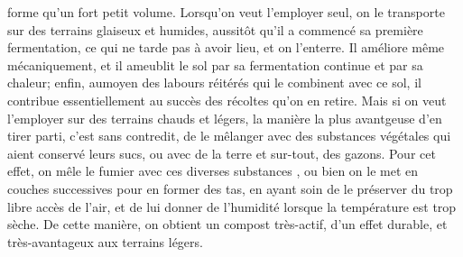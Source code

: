 forme qu'un fort petit volume.
Lorsqu'on veut l'employer seul, on le transporte sur des terrains glaiseux et humides,
aussitôt qu'il a commencé sa première fermentation, ce qui ne tarde pas à avoir lieu,
et on l'enterre. Il améliore même mécaniquement, et il ameublit le sol par sa fermentation continue et par sa chaleur; enfin, aumoyen des labours réitérés qui le combinent
avec ce sol, il contribue essentiellement
au
succès des récoltes qu'on en retire. Mais si
on veut l'employer sur des terrains chauds
et légers, la manière la plus avantgeuse
d'en tirer parti, c'est sans contredit, de le
mêlanger avec des substances
végétales qui
aient conservé leurs sucs, ou avec de la terre
et sur-tout, des gazons. Pour cet effet, on
mêle le fumier avec ces diverses substances
,
ou bien on le met en couches successives
pour en former des tas, en ayant
soin de
le préserver du trop libre accès de l'air, et\setcounter{page}{237} de lui donner de l'humidité lorsque la température est trop sèche. De cette manière, on obtient un compost très-actif, d'un effet durable, et très-avantageux aux terrains légers.
